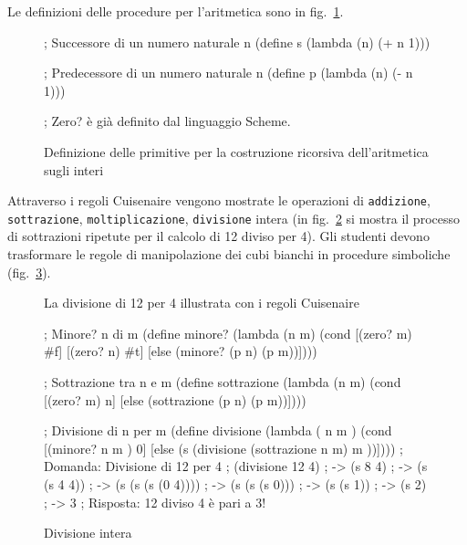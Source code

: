 \documentclass[withtimes]{easychair}
\begin{document}
Le definizioni delle procedure per l'aritmetica sono in fig.~\ref{fig:primitive-aritmetica}.

\begin{figure}
  \centering
  \begin{pygmented}[lang=scheme]
; Successore di un numero naturale n
(define s
  (lambda (n)
    (+ n 1)))

; Predecessore di un numero naturale n
(define p
  (lambda (n)
    (- n 1)))

; Zero? è già definito dal linguaggio Scheme.

  \end{pygmented}
  \caption{Definizione delle primitive per la costruzione ricorsiva dell'aritmetica sugli interi}\label{fig:primitive-aritmetica}
\end{figure}

Attraverso i regoli Cuisenaire vengono mostrate le operazioni di \texttt{addizione}, \texttt{sottrazione}, \texttt{moltiplicazione}, \texttt{divisione} intera (in fig.~\ref{fig:divisione-regoli} si mostra il processo di sottrazioni ripetute per il calcolo di 12 diviso per 4). Gli studenti devono trasformare le regole di manipolazione dei cubi bianchi in procedure simboliche (fig.~\ref{fig:divisione-scheme}).

\begin{figure}[ht]
    \centering
    
    \caption{La divisione di 12 per 4 illustrata con i regoli Cuisenaire\label{fig:divisione-regoli}}
\end{figure}


\begin{figure}
  \centering
  \begin{pygmented}[lang=scheme]
; Minore? n di m
(define minore?
  (lambda (n m)
    (cond
      [(zero? m) #f]
      [(zero? n) #t]
      [else (minore? (p n) (p m))])))

; Sottrazione tra n e m
(define sottrazione
  (lambda (n m)
    (cond
     [(zero? m) n]
     [else (sottrazione (p n) (p m))])))

; Divisione di n per m
(define divisione
  (lambda ( n m )
    (cond
     [(minore? n m ) 0]
     [else (s (divisione (sottrazione n m) m ))])))
; Domanda: Divisione di 12 per 4
; (divisione 12 4)
; -> (s 8 4)
; -> (s (s 4 4))
; -> (s (s (s (0 4))))
; -> (s (s (s 0)))
; -> (s (s 1))
; -> (s 2)
; -> 3
; Risposta: 12 diviso 4 è pari a 3!
  \end{pygmented}
  \caption{Divisione intera}\label{fig:divisione-scheme}
\end{figure}
\end{document}
